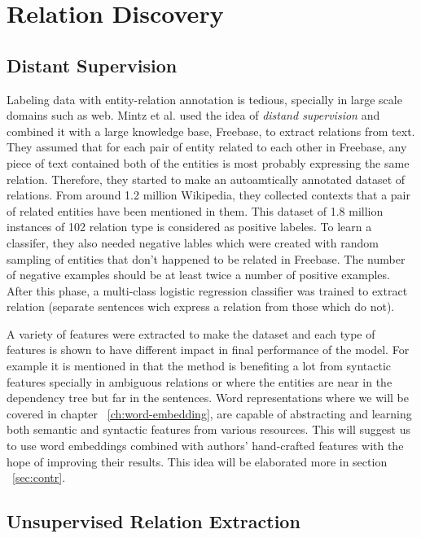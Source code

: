\chapter{Relation Discovery}
\label{ch:rel-discovery}

\section{Distant Supervision}
\label{sec:dist-supervision}


Labeling data with entity-relation annotation is tedious, specially in large
scale domains such as web. Mintz et al. \cite{Mintz2009} used the idea of
\emph{distand supervision} and combined it with a large knowledge base,
Freebase, to extract relations from text. They assumed that for each pair of
entity related to each other in Freebase, any piece of text contained both of
the entities is most probably expressing the same relation. Therefore, they
started to make an autoamtically annotated dataset of relations. From around 1.2
million Wikipedia, they collected contexts that a pair of related entities have
been mentioned in them. This dataset of 1.8 million instances of 102 relation
type is considered as positive labeles. To learn a classifer, they also needed
negative lables which were created with random sampling of entities that don't
happened to be related in Freebase. The number of negative examples should be at
least twice a number of positive examples. After this phase, a multi-class
logistic regression classifier was trained to extract relation (separate
sentences wich express a relation from those which do not).

A variety of features were extracted to make the dataset and each type of
features is shown to have different impact in final performance of the model.
For example it is mentioned in \cite{Mintz2009} that the method is benefiting a lot
from syntactic features specially in ambiguous relations or where the entities
are near in the dependency tree but far in the sentences. Word representations
where we will be covered in chapter ~\ref{ch:word-embedding}, are capable of
abstracting and learning both semantic and syntactic features from various
resources. This will suggest us to use word embeddings combined with
authors' hand-crafted features with the hope of improving their results. This
idea will be elaborated more in section ~\ref{sec:contr}.

\section{Unsupervised Relation Extraction}
\label{sec:related}


